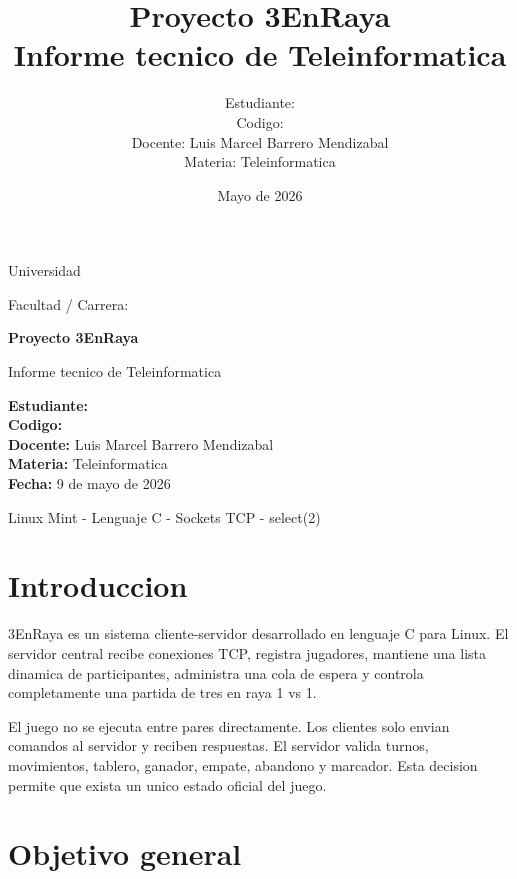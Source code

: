\documentclass[12pt,a4paper]{article}
\title{\textbf{Proyecto 3EnRaya}\\Informe tecnico de Teleinformatica}
\author{
    Estudiante: \underline{\hspace{8cm}}\\
    Codigo: \underline{\hspace{8cm}}\\
    Docente: Luis Marcel Barrero Mendizabal\\
    Materia: Teleinformatica
}
\date{Mayo de 2026}
\begin{document}
\begin{titlepage}
    \centering
    {\Large Universidad \underline{\hspace{8cm}}\par}
    \vspace{1.2cm}
    {\Large Facultad / Carrera: \underline{\hspace{7cm}}\par}
    \vspace{1.5cm}
    {\Huge \textbf{Proyecto 3EnRaya}\par}
    \vspace{0.5cm}
    {\Large Informe tecnico de Teleinformatica\par}
    \vspace{2cm}
    \begin{flushleft}
    \textbf{Estudiante:} \underline{\hspace{9cm}}\\[0.4cm]
    \textbf{Codigo:} \underline{\hspace{9.8cm}}\\[0.4cm]
    \textbf{Docente:} Luis Marcel Barrero Mendizabal\\[0.4cm]
    \textbf{Materia:} Teleinformatica\\[0.4cm]
    \textbf{Fecha:} 9 de mayo de 2026
    \end{flushleft}
    \vfill
    {\large Linux Mint - Lenguaje C - Sockets TCP - select(2)\par}
\end{titlepage}

\tableofcontents
\newpage

\section{Introduccion}

3EnRaya es un sistema cliente-servidor desarrollado en lenguaje C para Linux.
El servidor central recibe conexiones TCP, registra jugadores, mantiene una
lista dinamica de participantes, administra una cola de espera y controla
completamente una partida de tres en raya 1 vs 1.

El juego no se ejecuta entre pares directamente. Los clientes solo envian
comandos al servidor y reciben respuestas. El servidor valida turnos,
movimientos, tablero, ganador, empate, abandono y marcador. Esta decision
permite que exista un unico estado oficial del juego.

\section{Objetivo general}
\end{document}
